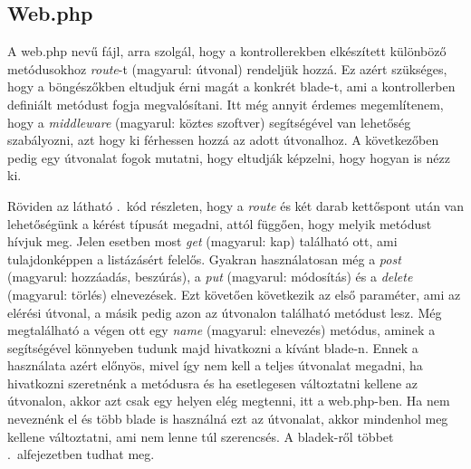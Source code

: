 \documentclass[]{thesis-ekf}
\theoremstyle{definition}
\theoremstyle{remark}
\begin{document}
	\subsection{Web.php}
		A web.php nevű fájl, arra szolgál, hogy a kontrollerekben elkészített különböző metódusokhoz \emph{route}-t (magyarul: útvonal) rendeljük hozzá. Ez azért szükséges, hogy a böngészőkben eltudjuk érni magát a konkrét blade-t, ami a kontrollerben definiált metódust fogja megvalósítani. Itt még annyit érdemes megemlítenem, hogy a \emph{middleware} (magyarul: köztes szoftver) segítségével van lehetőség szabályozni, azt hogy ki férhessen hozzá az adott útvonalhoz. A következőben pedig egy útvonalat fogok mutatni, hogy eltudják képzelni, hogy hogyan is nézz ki.
	
		
	
		Röviden az látható .~kód részleten, hogy a \emph{route} és két darab kettőspont után van lehetőségünk a kérést típusát megadni, attól függően, hogy melyik metódust hívjuk meg. Jelen esetben most \emph{get} (magyarul: kap) található ott, ami tulajdonképpen a listázásért felelős. Gyakran használatosan még a \emph{post} (magyarul: hozzáadás, beszúrás), a \emph{put} (magyarul: módosítás) és a \emph{delete} (magyarul: törlés) elnevezések. Ezt követően következik az első paraméter, ami az elérési útvonal, a másik pedig azon az útvonalon található metódust lesz. Még megtalálható a végen ott egy \emph{name} (magyarul: elnevezés) metódus, aminek a segítségével könnyeben tudunk majd hivatkozni a kívánt blade-n. Ennek a használata azért előnyös, mivel így nem kell a teljes útvonalat megadni, ha hivatkozni szeretnénk a metódusra és ha esetlegesen változtatni kellene az útvonalon, akkor azt csak egy helyen elég megtenni, itt a web.php-ben. Ha nem neveznénk el és több blade is használná ezt az útvonalat, akkor mindenhol meg kellene változtatni, ami nem lenne túl szerencsés. A bladek-ről többet .~alfejezetben tudhat meg.
		
\end{document}
